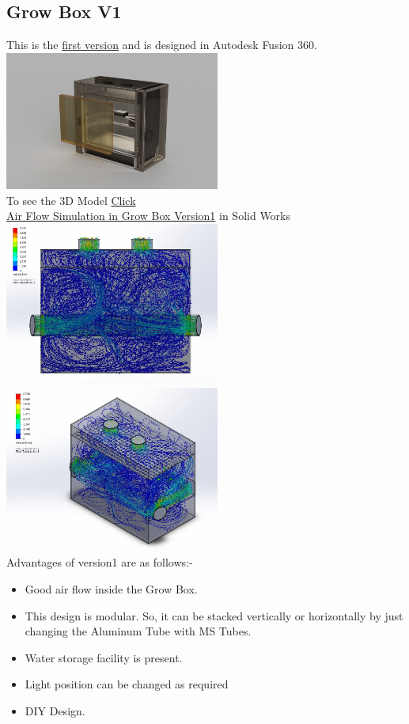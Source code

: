 \documentclass[a4paper,12pt,oneside]{book}
\begin{document}
\subsection{Grow Box V1}
This is the \href{https://www.youtube.com/watch?v=sGrjrwHcsWk}{first version} and is designed in Autodesk Fusion 360.\\
\includegraphics[width=200pt]{version_1}\\
To see the 3D Model  \href{http://a360.co/2rCJyYc}{Click}\\
\href{https://www.youtube.com/watch?v=ab_HcFKEwkE}{Air Flow Simulation in Grow Box Version1} in Solid Works\\
\includegraphics[width=200pt]{version_1_FV}
\includegraphics[width=200pt]{version_1_ISO}\\
Advantages of version1 are as follows:-
\begin{itemize}
    \item Good air flow inside the Grow Box.
    \item This design is modular. So, it can be stacked vertically or horizontally by just changing the Aluminum Tube with MS Tubes.
    \item Water storage facility is present.
    \item Light position can be changed as required
    \item DIY Design.
\end{itemize}
\end{document}
